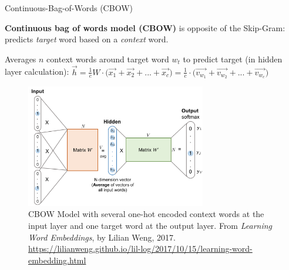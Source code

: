 \begin{frame}{Continuous-Bag-of-Words (CBOW)}\label{frame:CBOW}
    
    \begin{itemizeSpaced}{0pt}
        \item \textbf{Continuous bag of words model (CBOW)} is opposite of the Skip-Gram: predicts \emph{target} word based on a \emph{context} word. 
        
        \item Averages $n$ context words around target word $w_t$ to predict target (in hidden layer calculation): %
        $
        \overrightarrow{h} 
        = \frac{1}{c} W \cdot \Big(\overrightarrow{x_1} + \overrightarrow{x_2} + ... + \overrightarrow{x_c} \Big) 
        = \frac{1}{c} \cdot \Big(\overrightarrow{v_{w_1}} + \overrightarrow{v_{w_2}} + ... + \overrightarrow{v_{w_c}} \Big)
        $
        
    \end{itemizeSpaced}
    
    \begin{figure}[h] 
    \vspace{-5pt}
    \centering
    \includegraphics[width=0.7\textwidth]{imgs/cbow.png}
    \vspace{-5pt}
    \caption{\tiny CBOW Model with several one-hot encoded context words at the input layer and one target word at the output layer. From \emph{Learning Word Embeddings}, by Lilian Weng, 2017. \url{https://lilianweng.github.io/lil-log/2017/10/15/learning-word-embedding.html}}
    \label{fig:CBOW}
    \vspace{-5pt}
    \end{figure}
    
    
\end{frame}



